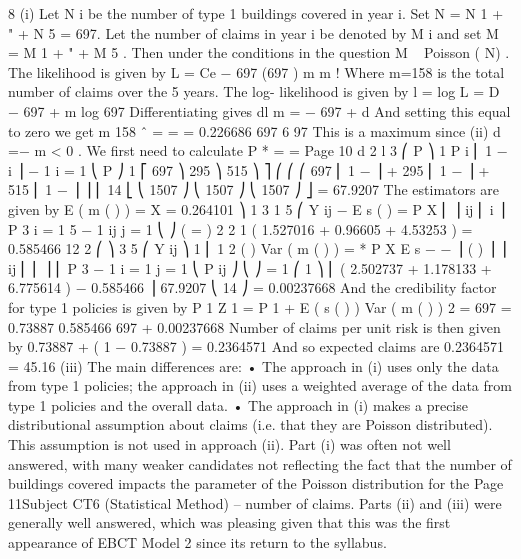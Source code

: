 \documentclass[a4paper,12pt]{article}
\begin{document}
8
(i)
Let N i be the number of type 1 buildings covered in year i. Set
N = N 1 + " + N 5 = 697. Let the number of claims in year i be denoted by M i
and set M = M 1 + " + M 5 . Then under the conditions in the question
M ~ Poisson ( N\lambda  ) .
The likelihood is given by
L = Ce − 697 \lambda 
(697 \lambda  ) m
m !
Where m=158 is the total number of claims over the 5 years. The log-
likelihood is given by
l = log L = D − 697 \lambda  + m log 697 \lambda 
Differentiating gives
dl
m
= − 697 +
d \lambda 
\lambda 
And setting this equal to zero we get
m
158
\lambda  ˆ =
=
= 0.226686
697 6 97
This is a maximum since
(ii)
d 
=−
m
< 0 .
We first need to calculate
P * =
=
Page 10
d 2 l
3
⎛ P ⎞
1
P i ⎜ 1 − i ⎟
  − 1 i = 1 ⎝
P ⎠
1 ⎡
697 ⎞
295 ⎞
515 ⎞ ⎤
⎛
⎛
⎛
697 ⎜ 1 −
⎟ + 295 ⎜ 1 −
⎟ + 515 ⎜ 1 −
⎟ ⎥
⎢
14 ⎣
⎝ 1507 ⎠
⎝ 1507 ⎠
⎝ 1507 ⎠ ⎦%
= 67.9207
The estimators are given by
E ( m ( \theta  ) ) = X = 0.264101
⎞
1 3 1 5 ⎛ Y ij
−
E s ( \theta  ) = \sum 
P
X
⎜
⎟
ij ⎜
i ⎟
P
3 i = 1 5 − 1 \sum 
ij
j = 1 ⎝
⎠
(
=
)
2
2
1
\times  ( 1.527016 + 0.96605 + 4.53253 ) = 0.585466
12
2
⎛
⎞
3 5
⎛ Y ij
⎞
1 ⎜ 1
2
(
)
Var ( m ( \theta  ) ) = *
P
X
E
s
−
−
\theta 
⎟
( ) ⎟ ⎟
ij ⎜
\sum \sum 
⎜
⎟
⎜
P 3  − 1 i = 1 j = 1 ⎝ P ij
⎠
⎝
⎠
=
1
⎛ 1
⎞
\times  ⎜ ( 2.502737 + 1.178133 + 6.775614 ) − 0.585466 ⎟
67.9207 ⎝ 14
⎠
= 0.00237668
And the credibility factor for type 1 policies is given by
P 1
Z 1 =
P 1 +
E ( s ( \theta  ) )
Var ( m ( \theta  ) )
2
=
697
= 0.73887
0.585466
697 +
0.00237668
Number of claims per unit risk is then given by
0.73887  + ( 1 − 0.73887 )  = 0.2364571
And so expected claims are 0.2364571  = 45.16
(iii)
The main differences are:
• The approach in (i) uses only the data from type 1 policies; the approach in
(ii) uses a weighted average of the data from type 1 policies and the overall
data.
• The approach in (i) makes a precise distributional assumption about claims
(i.e. that they are Poisson distributed). This assumption is not used in
approach (ii).
Part (i) was often not well answered, with many weaker candidates not reflecting the fact that
the number of buildings covered impacts the parameter of the Poisson distribution for the
Page 11Subject CT6 (Statistical Method) – %
number of claims. Parts (ii) and (iii) were generally well answered, which was pleasing
given that this was the first appearance of EBCT Model 2 since its return to the syllabus.
\end{document}

